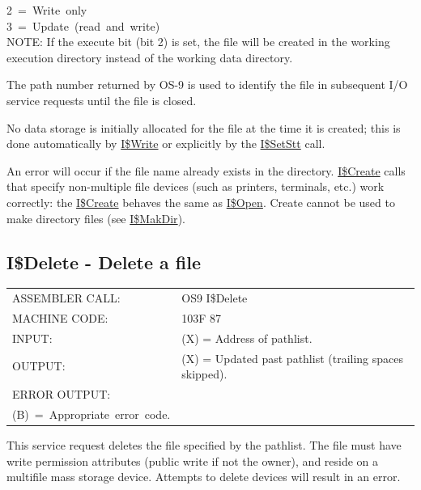 \documentclass[
]{article}
\newcounter{none} %
\begin{document}
2~=~Write~only\\
3~=~Update~(read~and~write)\\

NOTE: If the execute bit (bit 2) is set, the file will be created in the
working execution directory instead of the working data directory.

The path number returned by OS-9 is used to identify the file in
subsequent I/O service requests until the file is closed.

No data storage is initially allocated for the file at the time it is
created; this is done automatically by \hyperref[i.write]{I\$Write} or
explicitly by the \hyperref[i.setstt]{I\$SetStt} call.

An error will occur if the file name already exists in the directory.
\hyperref[i.create]{I\$Create} calls that specify non-multiple file
devices (such as printers, terminals, etc.) work correctly: the
\hyperref[i.create]{I\$Create} behaves the same as
\hyperref[i.open]{I\$Open}. Create cannot be used to make directory
files (see \hyperref[i.makdir]{I\$MakDir}).

\subsection{I\$Delete - Delete a file}

{\def\LTcaptype{none} %
\begin{longtable}[]{@{}
  >{\raggedright\arraybackslash}p{}
  >{\raggedright\arraybackslash}p{}@{}}
\toprule\noalign{}
\endhead
\bottomrule\noalign{}
\endlastfoot
ASSEMBLER CALL: & OS9 I\$Delete \\
MACHINE CODE: & 103F 87 \\
INPUT: & (X) = Address of pathlist. \\
OUTPUT: & (X) = Updated past pathlist (trailing spaces skipped). \\
ERROR OUTPUT: & \begin{minipage}[t]{\linewidth}\raggedright
(CC)~=~C~bit~set.\\
(B)~=~Appropriate~error~code.
\end{minipage} \\
\end{longtable}
}

This service request deletes the file specified by the pathlist. The
file must have write permission attributes (public write if not the
owner), and reside on a multifile mass storage device. Attempts to
delete devices will result in an error.
\end{document}
